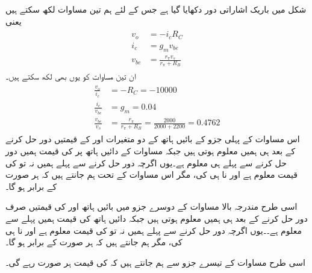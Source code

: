 شکل   میں باریک اشاراتی دور دکھایا گیا ہے جس کے لئے ہم تین مساوات لکھ سکتے ہیں یعنی
\begin{gather}
\begin{aligned}
v_o &=-i_c R_C\\
i_c &=g_m v_{be}\\
v_{be} &=\frac{r_{\pi} v_s}{r_{\pi}+R_B}
\end{aligned}
\end{gather}
ان تین مساوات کو یوں بھی لکھ سکتے ہیں۔
\begin{gather}  \label{مساوات_ٹرانزسٹر_شرح_کی_قیمتیں_الف}
\begin{aligned}
\frac{v_o}{i_c}&=-R_C = \num{-10000}\\
\frac{i_c}{v_{be}}&=g_m=\num{0.04}\\
\frac{v_{be}}{v_s}&=\frac{r_{\pi}}{r_{\pi}+R_B}=\frac{2000}{2000+2200}=\num{0.4762}
\end{aligned}
\end{gather}
اس مساوات کے پہلی جزو کے بائیں ہاتھ کے دو متغیرات  اور  کے قیمتیں دور حل کرنے کے بعد ہی ہمیں معلوم ہوتی ہیں جبکہ مساوات کے دائیں ہاتھ پر  کی قیمت  ہمیں دور حل کرنے سے پہلے ہی معلوم ہے۔یوں اگرچہ دور حل کرنے سے پہلے ہمیں نہ تو  کی قیمت معلوم ہے اور نا ہی  کی، مگر اس مساوات کے تحت ہم جانتے ہیں کہ  ہر صورت  کے برابر ہو گا۔


اسی طرح مندرجہ بالا مساوات کے دوسرے جزو میں بائیں ہاتھ  اور  کی قیمتیں صرف دور حل کرنے کے بعد ہی ہمیں معلوم ہوتی ہیں جبکہ دائیں ہاتھ  کی قیمت  ہمیں پہلے سے معلوم ہے۔۔یوں اگرچہ دور حل کرنے سے پہلے ہمیں نہ تو  کی قیمت معلوم ہے اور نا ہی  کی، مگر ہم جانتے ہیں کہ  ہر صورت  کے برابر ہو گا۔

اسی طرح مساوات کے تیسرے جزو سے ہم جانتے ہیں کہ  کی قیمت ہر صورت  رہے گی۔

